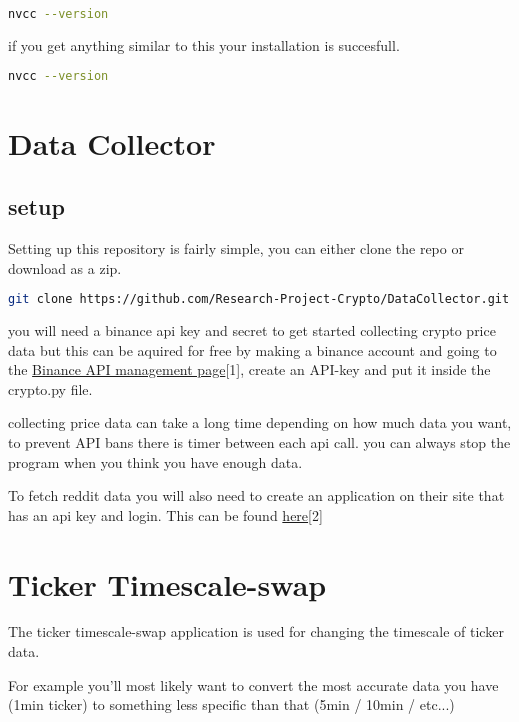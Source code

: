 \documentclass[12pt,a4paper]{article}
\begin{document}
\begin{lstlisting}[language=bash]
    nvcc --version
\end{lstlisting}

if you get anything similar to this your installation is succesfull.

\begin{lstlisting}[language=bash]
    nvcc --version
\end{lstlisting}

\section{Data Collector}

\subsection{setup}
Setting up this repository is fairly simple, you can either clone the repo or download as a zip.

\begin{lstlisting}[language=bash]
git clone https://github.com/Research-Project-Crypto/DataCollector.git 
\end{lstlisting}

you will need a binance api key and secret to get started collecting crypto price data but this can be aquired for free by making a binance account and going to the \href{https://www.binance.com/en/my/settings/api-management}{Binance API management page}[1], create an API-key and put it inside the crypto.py file.

collecting price data can take a long time depending on how much data you want, to prevent API bans there is timer between each api call. you can always stop the program when you think you have enough data.

To fetch reddit data you will also need to create an application on their site that has an api key and login. This can be found \href{https://www.reddit.com/prefs/apps}{here}[2]

\section{Ticker Timescale-swap}

The ticker timescale-swap application is used for changing the timescale of ticker data.

For example you'll most likely want to convert the most accurate data you have (1min ticker) to something less specific than that (5min / 10min / etc...)
\end{document}
